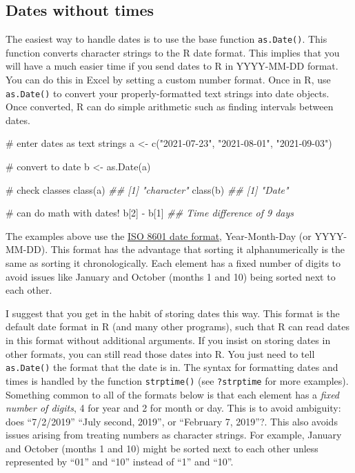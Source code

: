 \documentclass[
  13,
  letterpaper,
]{report}
\newenvironment{Shaded}{\begin{snugshade}}{\end{snugshade}}
\newcommand{\CommentTok}[1]{\textcolor[rgb]{0.37,0.37,0.37}{#1}}
\newcommand{\DecValTok}[1]{\textcolor[rgb]{0.68,0.00,0.00}{#1}}
\newcommand{\DocumentationTok}[1]{\textcolor[rgb]{0.37,0.37,0.37}{\textit{#1}}}
\newcommand{\FunctionTok}[1]{\textcolor[rgb]{0.28,0.35,0.67}{#1}}
\newcommand{\NormalTok}[1]{\textcolor[rgb]{0.00,0.23,0.31}{#1}}
\newcommand{\OtherTok}[1]{\textcolor[rgb]{0.00,0.23,0.31}{#1}}
\newcommand{\SpecialCharTok}[1]{\textcolor[rgb]{0.37,0.37,0.37}{#1}}
\newcommand{\StringTok}[1]{\textcolor[rgb]{0.13,0.47,0.30}{#1}}
\begin{document}
\subsection{Dates without times}\label{sec-manip-date-date}

The easiest way to handle dates is to use the base function
\texttt{as.Date()}. This function converts character strings to the R
date format. This implies that you will have a much easier time if you
send dates to R in YYYY-MM-DD format. You can do this in Excel by
setting a custom number format. Once in R, use \texttt{as.Date()} to
convert your properly-formatted text strings into date objects. Once
converted, R can do simple arithmetic such as finding intervals between
dates.

\begin{Shaded}
\begin{Highlighting}[]

\CommentTok{\# enter dates as text strings}
\NormalTok{a }\OtherTok{\textless{}{-}} \FunctionTok{c}\NormalTok{(}\StringTok{"2021{-}07{-}23"}\NormalTok{, }\StringTok{"2021{-}08{-}01"}\NormalTok{, }\StringTok{"2021{-}09{-}03"}\NormalTok{)}

\CommentTok{\# convert to date}
\NormalTok{b }\OtherTok{\textless{}{-}} \FunctionTok{as.Date}\NormalTok{(a)}

\CommentTok{\# check classes}
\FunctionTok{class}\NormalTok{(a)}
\DocumentationTok{\#\# [1] "character"}
\FunctionTok{class}\NormalTok{(b)}
\DocumentationTok{\#\# [1] "Date"}

\CommentTok{\# can do math with dates!}
\NormalTok{b[}\DecValTok{2}\NormalTok{] }\SpecialCharTok{{-}}\NormalTok{ b[}\DecValTok{1}\NormalTok{]}
\DocumentationTok{\#\# Time difference of 9 days}
\end{Highlighting}
\end{Shaded}

The examples above use the
\href{https://en.wikipedia.org/wiki/ISO_8601}{ISO 8601 date format},
Year-Month-Day (or YYYY-MM-DD). This format has the advantage that
sorting it alphanumerically is the same as sorting it chronologically.
Each element has a fixed number of digits to avoid issues like January
and October (months 1 and 10) being sorted next to each other.

I suggest that you get in the habit of storing dates this way. This
format is the default date format in R (and many other programs), such
that R can read dates in this format without additional arguments. If
you insist on storing dates in other formats, you can still read those
dates into R. You just need to tell \texttt{as.Date()} the format that
the date is in. The syntax for formatting dates and times is handled by
the function \texttt{strptime()} (see \texttt{?strptime} for more
examples). Something common to all of the formats below is that each
element has a \emph{fixed number of digits}, 4 for year and 2 for month
or day. This is to avoid ambiguity: does ``7/2/2019'' ``July second,
2019'', or ``February 7, 2019''?. This also avoids issues arising from
treating numbers as character strings. For example, January and October
(months 1 and 10) might be sorted next to each other unless represented
by ``01'' and ``10'' instead of ``1'' and ``10''.
\end{document}
